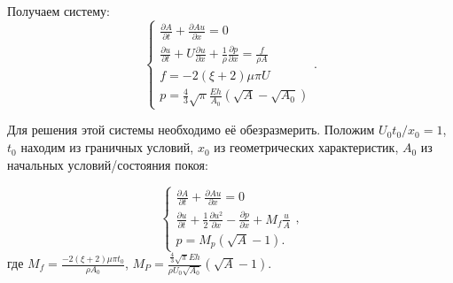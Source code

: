 Получаем систему:
\begin{equation}
    \label{sys_of_eq}
    \begin{cases}
        \frac{\partial A}{\partial t}+\frac{\partial Au}{\partial x}=0\\
        \frac{\partial u}{\partial t}+U\frac{\partial u}{\partial x}+\frac{1}{\rho}\frac{\partial p}{\partial x}=\frac{f}{\rho A}\\
        f=-2(\xi+2)\mu\pi U\\
        p=\frac{4}{3}\sqrt{\pi}\frac{Eh}{A_0}(\sqrt{A}-\sqrt{A_0})
    \end{cases}.
    \end{equation}

Для решения этой системы необходимо её обезразмерить. Положим ${U_0 t_0}/{x_0}=1$, $t_0$ находим из граничных условий, 
$x_0$ из геометрических характеристик, $A_0$ из начальных условий/состояния покоя:

\begin{equation}
    \label{sys_of_eq1}
    \begin{cases}
        \frac{\partial A}{\partial t}+\frac{\partial Au}{\partial x}=0\\
        \frac{\partial u}{\partial t}+\frac{1}{2}\frac{\partial u^2}{\partial x}-\frac{\partial p}{\partial x}+M_f \frac{u}{A}\\
        p=M_p(\sqrt{A}-1).
    \end{cases},
    \end{equation}
где $M_f=\frac{-2(\xi+2)\mu \pi t_0}{\rho A_0}$, $M_P=\frac{\frac{4}{3}\sqrt{\pi}Eh}{\rho U_0\sqrt{A_0}}(\sqrt{A}-1)$.

    
